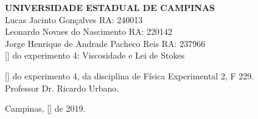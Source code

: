 \documentclass[a4paper, 11pt]{article}
\begin{document}

\thispagestyle{empty}
\begin{titlepage}
 \vfill
  \begin{center}
   {\large \textbf{UNIVERSIDADE ESTADUAL DE CAMPINAS}} \\[3cm] %

   {\large Lucas Jacinto Gonçalves RA: 240013 }\\[0.25cm] %
   {\large Leonardo Novaes do Nascimento RA: 220142 }\\[0.25cm]
   {\large Jorge Henrique de Andrade Pacheco Reis RA: 237966 }\\[5.5cm]


   {\Large [] do experimento 4: Viscosidade e Lei de Stokes}\\[6cm] %

   \hspace{.45\textwidth} %
   \begin{minipage}{.5\textwidth}
   \large [] do experimento 4, da disciplina de Física Experimental 2, F 229.\\[1cm]
Professor Dr. Ricardo Urbano.		%
  \end{minipage}
  \vfill

\vspace{2cm}

\large Campinas, [] de 2019. 	%


\end{center}

\end{titlepage}

\end{document}
